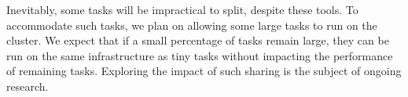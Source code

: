 Inevitably, some tasks will be impractical to split, despite these tools.
To accommodate such
tasks, we plan on allowing some large tasks to run on the cluster. We expect
that if a small percentage of tasks remain large, they can be run on the same 
infrastructure as tiny tasks without impacting the performance of remaining tasks.
Exploring the impact of such sharing is the subject of ongoing research.
